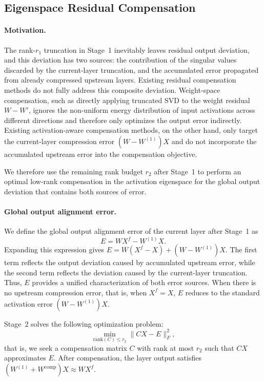 \documentclass[a4paper,fleqn]{cas-dc}
\begin{document}
\subsection{Eigenspace Residual Compensation}

\paragraph{Motivation.}
The rank-$r_1$ truncation in Stage~1 inevitably leaves residual output deviation, and this deviation has two sources: the contribution of the singular values discarded by the current-layer truncation, and the accumulated error propagated from already compressed upstream layers. Existing residual compensation methods do not fully address this composite deviation. Weight-space compensation, such as directly applying truncated SVD to the weight residual $W-W'$, ignores the non-uniform energy distribution of input activations across different directions and therefore only optimizes the output error indirectly. Existing activation-aware compensation methods, on the other hand, only target the current-layer compression error $(W-W^{(1)})X$ and do not incorporate the accumulated upstream error into the compensation objective.

We therefore use the remaining rank budget $r_2$ after Stage~1 to perform an optimal low-rank compensation in the activation eigenspace for the global output deviation that contains both sources of error.

\paragraph{Global output alignment error.}
We define the global output alignment error of the current layer after Stage~1 as
\begin{equation}
E = WX^f - W^{(1)}X.
\tag{5}
\end{equation}
Expanding this expression gives $E = W(X^f - X) + (W - W^{(1)})X$. The first term reflects the output deviation caused by accumulated upstream error, while the second term reflects the deviation caused by the current-layer truncation. Thus, $E$ provides a unified characterization of both error sources. When there is no upstream compression error, that is, when $X^f = X$, $E$ reduces to the standard activation error $(W-W^{(1)})X$.

Stage~2 solves the following optimization problem:
\begin{equation}
\min_{\mathrm{rank}(C) \le r_2} \|CX - E\|_F^2,
\tag{6}
\end{equation}
that is, we seek a compensation matrix $C$ with rank at most $r_2$ such that $CX$ approximates $E$. After compensation, the layer output satisfies $(W^{(1)} + W^{\mathrm{comp}})X \approx WX^f$.
\end{document}
